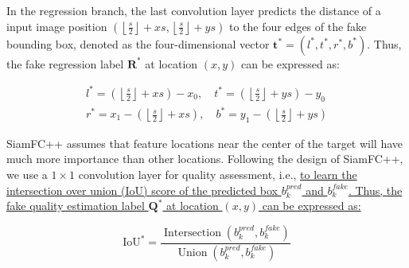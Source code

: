 \documentclass[journal]{IEEEtran}
\newcommand{\ie}{i.e.}
\begin{document}
In the regression branch, the last convolution layer predicts the distance of a input image position $\left(\left\lfloor\frac{s}{2}\right\rfloor+x s,\left\lfloor\frac{s}{2}\right\rfloor+y s\right)$ to the four edges of the fake bounding box, denoted as the four-dimensional vector $\boldsymbol{t}^{*}=\left(l^{*}, t^{*}, r^{*}, b^{*}\right)$. Thus, the fake regression label $\textbf{R}^*$ at location $(x,y)$ can be expressed as:

\begin{equation}
  \begin{array}{ll}
  l^{*}=\left(\left\lfloor\frac{s}{2}\right\rfloor+x s\right)-x_{0}, \quad t^{*}=\left(\left\lfloor\frac{s}{2}\right\rfloor+y s\right)-y_{0} \\
  r^{*}=x_{1}-\left(\left\lfloor\frac{s}{2}\right\rfloor+x s\right), \quad b^{*}=y_{1}-\left(\left\lfloor\frac{s}{2}\right\rfloor+y s\right)
  \end{array}
\end{equation}

SiamFC++ assumes that feature locations near the center of the target will have much more importance than other locations. Following the design of SiamFC++, we use a $1 \times 1$ convolution layer for quality assessment, \ie, \uline{to learn the intersection over union (IoU) score of the predicted box $b^{pred}_k$ and $b^{fake}_k$. Thus, the fake quality estimation label $\textbf{Q}^*$ at location $(x,y)$ can be expressed as:}

\begin{equation}
  \mathrm{IoU}^{*}=\frac{\operatorname{ Intersection }\left(b^{pred}_k, b^{fake}_k\right)}{\operatorname{Union}\left(b^{pred}_k, b^{fake}_k\right)}
\end{equation}
\end{document}
